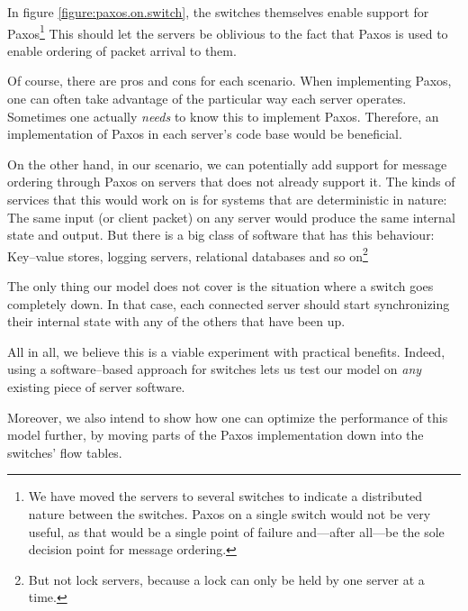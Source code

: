 In figure \ref{figure:paxos.on.switch}, the switches themselves enable
support for Paxos\footnote{We have moved the servers to several switches
to indicate a distributed nature between the switches.
Paxos on a single switch would not be very useful, as that would be a single
point of failure and---after all---be the sole decision point for message
ordering.}
This should let the servers be oblivious to the fact that Paxos is used to
enable ordering of packet arrival to them.

Of course, there are pros and cons for each scenario.
When implementing Paxos, one can often take advantage of
the particular way each server operates. Sometimes one actually
\textit{needs} to know this to implement Paxos.  Therefore, an
implementation of Paxos in each server's code base would be beneficial.

On the other hand, in our scenario, we can potentially add support for
message ordering through Paxos on servers that does not already support it.
The kinds of services that this would work on is for systems that are
deterministic in nature: The same input (or client packet) on any server
would produce the same internal state and output.
%
But there is a big class of software that has this behaviour:  Key--value
stores, logging servers, relational databases and so on\footnote{But not
lock servers, because a lock can only be held by one server at a time.}

The only thing our model does not cover is the situation where a switch goes
completely down.  In that case, each connected server should start
synchronizing their internal state with any of the others that have been up.

All in all, we believe this is a viable experiment with practical benefits.
Indeed, using a software--based approach for switches lets us test our model
on \textit{any} existing piece of server software.

Moreover, we also intend to show how one can optimize the performance of
this model further, by moving parts of the Paxos implementation down into
the switches' flow tables.

